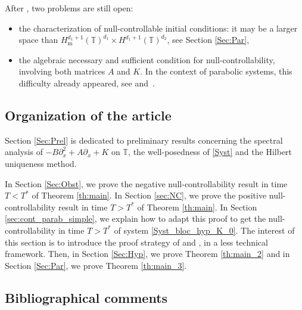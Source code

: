 \documentclass[11pt]{article}
\newcommand{\Subsection}{\subsection}
\theoremstyle{plain}
\theoremstyle{definition}
\theoremstyle{remark}
\newcommand{\set}{\mathbb}
\newcommand{\T}{\set{T}}
\newcommand{\m}{{\mathrm m}}
\begin{document}
\pagebreak[2]
After , two problems are still open:
\begin{itemize}
\item the characterization of null-controllable initial conditions: it may be a larger space than $H^{d_1+1}_\m(\T)^{d_1} \times H^{d_1+1}(\T)^{d_2}$, see Section \ref{Sec:Par},
\item the algebraic necessary and sufficient condition for null-controllability, involving both matrices $A$ and $K$. In the context of parabolic systems, this difficulty already appeared, see \cite{ammarkhodja_2009} and~\cite{duprez_2016a}.
\end{itemize}

\subsection{Organization of the article}

Section \ref{Sec:Prel} is dedicated to preliminary results concerning the spectral analysis of $-B\partial_x^2+A\partial_x+K$ on $\T$, the well-posedness of \eqref{Syst} and the Hilbert uniqueness method.

In Section \ref{Sec:Obst}, we prove the negative null-controllability result in time $T<T^\ast$ of Theorem \ref{th:main}. In Section \ref{sec:NC}, we prove the positive null-controllability result in time $T>T^\ast$ of Theorem \ref{th:main}. In Section \ref{sec:cont_parab_simple}, we explain how to adapt this proof to get the null-controllability in time $T>T^\ast$ of system \eqref{Syst_bloc_hyp_K_0}. The interest of this section is to introduce the proof strategy of  and , in a less technical framework. Then, in Section \ref{Sec:Hyp}, we prove Theorem \ref{th:main_2} and in Section \ref{Sec:Par}, we prove Theorem \ref{th:main_3}.

\Subsection{Bibliographical comments}
\end{document}
